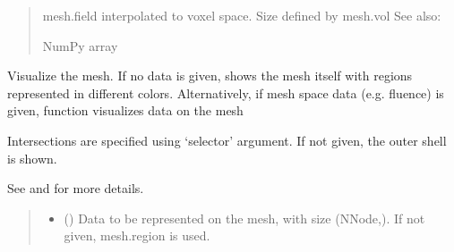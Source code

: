 \documentclass[letterpaper,10pt,english]{sphinxmanual}
\begin{document}
\begin{fulllineitems}
\begin{fulllineitems}
\begin{quote}
\begin{description}
\sphinxAtStartPar
{} \textendash{} mesh.field interpolated to voxel space. Size defined by mesh.vol
See also: {\hyperref[\detokenize{_autosummary/nirfasterff.utils.nntogrid:nirfasterff.utils.nntogrid}]{}}

\sphinxAtStartPar
NumPy array

\end{description}\end{quote}

\end{fulllineitems}


\begin{fulllineitems}
\label{\detokenize{_autosummary/nirfasterff.base.mesh.mesh:nirfasterff.base.mesh.mesh.plot}}
\pysigstartsignatures
\pysiglinewithargsret
{}
{\sphinxparamcomma {}\sphinxparamcomma {}\sphinxparamcomma {}\sphinxparamcomma {}}
{}
\pysigstopsignatures
\sphinxAtStartPar
Visualize the mesh. If no data is given, shows the mesh itself with regions represented in different colors.
Alternatively, if mesh space data (e.g. fluence) is given, function visualizes data on the mesh

\sphinxAtStartPar
Intersections are specified using ‘selector’ argument. If not given, the outer shell is shown.

\sphinxAtStartPar
See {\hyperref[\detokenize{_autosummary/nirfasterff.visualize.plotimage:nirfasterff.visualize.plotimage}]{}} and {\hyperref[\detokenize{_autosummary/nirfasterff.visualize.plot3dmesh_v2:nirfasterff.visualize.plot3dmesh_v2}]{}} for more details.
\begin{quote}\begin{description}
\begin{itemize}
\item {} 
\sphinxAtStartPar
{} (\sphinxstyleliteralemphasis{\sphinxupquote{, }}) \textendash{} Data to be represented on the mesh, with size (NNode,). If not given, mesh.region is used.


\end{itemize}
\end{description}
\end{quote}
\end{fulllineitems}
\end{fulllineitems}
\end{document}
